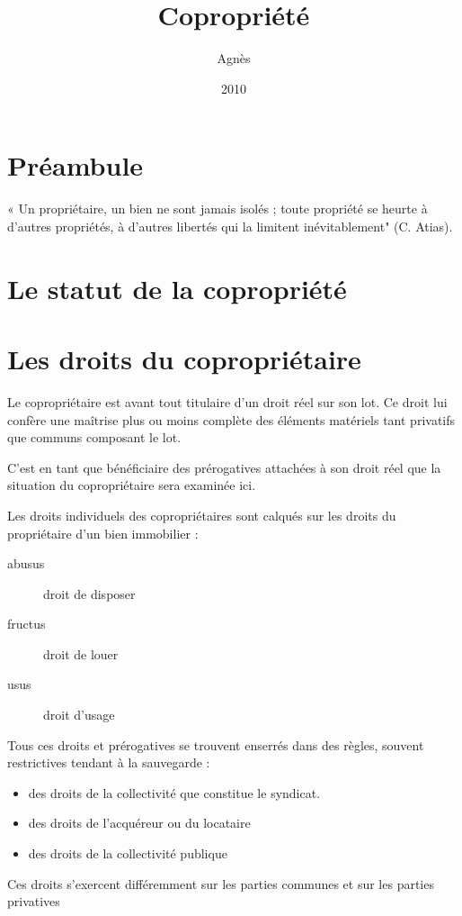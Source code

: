 \documentclass[10pt,a4paper,twoside]{book}
\author{Agnès \nom{Lebatteux}}
\title{Copropriété}
\date{2010}
\begin{document}
	\maketitle
	
	\frontmatter
	
	\part*{Préambule}
	
		« Un propriétaire, un bien ne sont jamais isolés ; toute
		propriété se heurte à d’autres propriétés, à d’autres libertés
		qui la limitent inévitablement" (C. Atias).
	
		
	
	\mainmatter
	
	\part{Le statut de la copropriété}
	
		
		
		
		
		
	\part{Les droits du copropriétaire}
	
		Le copropriétaire est avant tout titulaire d'un droit réel sur son lot. Ce droit lui confère une maîtrise plus
		ou moins complète des éléments matériels tant privatifs que communs composant le lot.
		
		C'est en tant que bénéficiaire des prérogatives attachées à son droit réel que la situation du copropriétaire
		sera examinée ici.
		\bigskip
		
		Les droits individuels des copropriétaires sont calqués sur les droits du propriétaire d’un bien immobilier :
		\begin{description}
			\item[abusus] droit de disposer
			\item[fructus] droit de louer
			\item[usus] droit d’usage
		\end{description}
		\bigskip
		
		Tous ces droits et prérogatives se trouvent enserrés dans des règles, souvent restrictives tendant à la
		sauvegarde :
		\begin{itemize}
			\item  des droits de la collectivité que constitue le syndicat.
			\item  des droits de l’acquéreur ou du locataire
			\item  des droits de la collectivité publique
		\end{itemize}
		Ces droits s’exercent différemment sur les parties communes et sur les parties privatives
	
\end{document}
